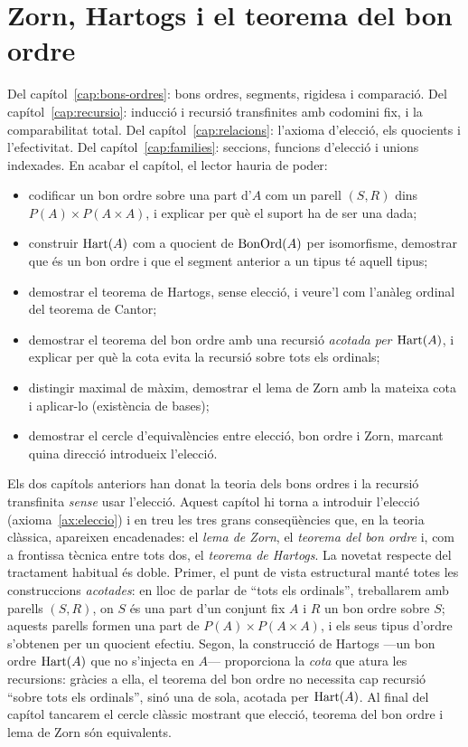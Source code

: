 \chapter{Zorn, Hartogs i el teorema del bon ordre}\label{cap:zorn}

\begin{objectius}
 Del capítol~\ref{cap:bons-ordres}: bons ordres, segments, rigidesa i comparació. Del capítol~\ref{cap:recursio}: inducció i recursió transfinites amb codomini fix, i la comparabilitat total. Del capítol~\ref{cap:relacions}: l'axioma d'elecció, els quocients i l'efectivitat. Del capítol~\ref{cap:families}: seccions, funcions d'elecció i unions indexades.
 En acabar el capítol, el lector hauria de poder:
\begin{itemize}
  \item codificar un bon ordre sobre una part d'\(A\) com un parell \((S,R)\) dins \(P(A)\times P(A\times A)\), i explicar per què el suport ha de ser una dada;
  \item construir \(\operatorname{Hart}(A)\) com a quocient de \(\operatorname{BonOrd}(A)\) per isomorfisme, demostrar que és un bon ordre i que el segment anterior a un tipus té aquell tipus;
  \item demostrar el teorema de Hartogs, sense elecció, i veure'l com l'anàleg ordinal del teorema de Cantor;
  \item demostrar el teorema del bon ordre amb una recursió \emph{acotada per \(\operatorname{Hart}(A)\)}, i explicar per què la cota evita la recursió sobre tots els ordinals;
  \item distingir maximal de màxim, demostrar el lema de Zorn amb la mateixa cota i aplicar-lo (existència de bases);
  \item demostrar el cercle d'equivalències entre elecció, bon ordre i Zorn, marcant quina direcció introdueix l'elecció.
\end{itemize}
\end{objectius}

Els dos capítols anteriors han donat la teoria dels bons ordres i la
recursió transfinita \emph{sense} usar l'elecció. Aquest capítol hi torna a
introduir l'elecció (axioma~\ref{ax:eleccio}) i en treu les tres grans
conseqüències que, en la teoria clàssica, apareixen encadenades: el
\emph{lema de Zorn}, el \emph{teorema del bon ordre} i, com a frontissa
tècnica entre tots dos, el \emph{teorema de Hartogs}. La novetat respecte del
tractament habitual és doble. Primer, el punt de vista estructural manté totes
les construccions \emph{acotades}: en lloc de parlar de \enquote{tots els
ordinals}, treballarem amb parells \((S,R)\), on \(S\) és una part d'un
conjunt fix \(A\) i \(R\) un bon ordre sobre \(S\); aquests parells formen una
part de \(P(A)\times P(A\times A)\), i els seus tipus d'ordre s'obtenen
per un quocient efectiu. Segon, la construcció de Hartogs ---un bon ordre
\(\operatorname{Hart}(A)\) que no s'injecta en \(A\)--- proporciona la \emph{cota} que atura
les recursions: gràcies a ella, el teorema del bon ordre no necessita cap
recursió \enquote{sobre tots els ordinals}, sinó una de sola, acotada per
\(\operatorname{Hart}(A)\). Al final del capítol tancarem el cercle clàssic mostrant que
elecció, teorema del bon ordre i lema de Zorn són equivalents.


